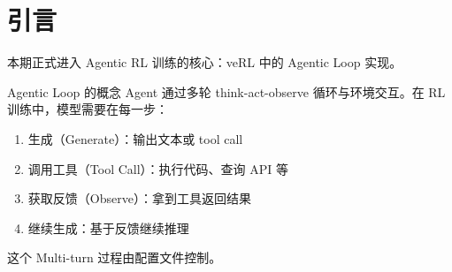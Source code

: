 \section{引言}
本期正式进入 Agentic RL 训练的核心：veRL 中的 Agentic Loop 实现。

\begin{importantbox}{Agentic Loop 的概念}
Agent 通过多轮 think-act-observe 循环与环境交互。在 RL 训练中，模型需要在每一步：
\begin{enumerate}
  \item 生成（Generate）：输出文本或 tool call
  \item 调用工具（Tool Call）：执行代码、查询 API 等
  \item 获取反馈（Observe）：拿到工具返回结果
  \item 继续生成：基于反馈继续推理
\end{enumerate}
这个 Multi-turn 过程由配置文件控制。
\end{importantbox}

